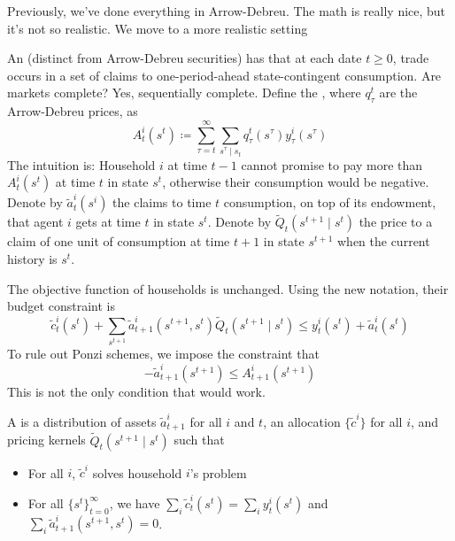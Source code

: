 \documentclass[10pt]{article}
\begin{document}
Previously, we've done everything in Arrow-Debreu. The math is really nice, but it's not so realistic. We move to a more realistic setting
\begin{model} 
	An  (distinct from Arrow-Debreu securities) has that at each date $t \ge 0$, trade occurs in a set of claims to one-period-ahead state-contingent consumption. Are markets complete? Yes, sequentially complete. Define the , where $q_\tau^t$ are the Arrow-Debreu prices, as
	\[
	A_t^i(s^t) \coloneqq \sum_{\tau=t}^\infty \sum_{s^\tau \mid s_t} q_\tau^t(s^\tau) y_\tau^i(s^\tau)
	\]
	The intuition is: Household $i$ at time $t-1$ cannot promise to pay more than $A_t^i(s^t)$ at time $t$ in state $s^t$, otherwise their consumption would be negative. Denote by $\tilde{a}_t^i(s^i)$ the claims to time $t$ consumption, on top of its endowment, that agent $i$ gets at time $t$ in state $s^t$. Denote by $\tilde{Q}_t(s^{t+1} \mid s^t)$ the price to a claim of one unit of consumption at time $t+1$ in state $s^{t+1}$ when the current history is $s^t$.
	
	The objective function of households is unchanged. Using the new notation, their budget constraint is
	\[
	\tilde{c}_t^i(s^t) + \sum_{s^{t+1}} \tilde{a}_{t+1}^i (s^{t+1},s^t)\tilde{Q}_t(s^{t+1} \mid s^t) \le y_t^i(s^t) + \tilde{a}_t^i(s^t)
	\]
	To rule out Ponzi schemes, we impose the constraint that
	\[
	-\tilde{a}^i_{t+1}(s^{t+1}) \le A_{t+1}^i(s^{t+1})
	\]
	This is not the only condition that would work.
\end{model}

\begin{definition}
	A  is a distribution of assets $\tilde{a}^i_{t+1}$ for all $i$ and $t$, an allocation $\{\tilde{c}^i\}$ for all $i$, and pricing kernels $\tilde{Q}_{t}(s^{t+1} \mid s^t)$ such that
	\begin{itemize}
		\item For all $i$, $\tilde{c}^i$ solves household $i$'s problem
		\item For all $\{s^t\}_{t=0}^\infty$, we have $\sum_i \tilde{c}^i_t(s^t) = \sum_i y^i_t(s^t)$ and $\sum_i \tilde{a}^i_{t+1}(s^{t+1},s^t) = 0$.
	\end{itemize}
\end{definition}
\end{document}
